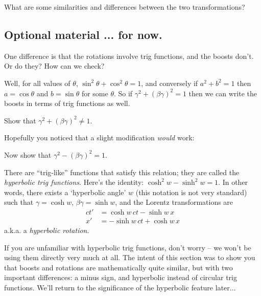 \documentclass[11pt, letterpaper, openany]{book}
\newenvironment{exercise}[1][Exercise]{%
  \tcolorbox[blanker, breakable, left=1em,
    before skip=1em, after skip=1em,
    borderline west={3pt}{0pt}{PhysNavy},
    colback=PhysCream,
    before upper={\textcolor{PhysNavy}{\sffamily\bfseries #1:}\space}
  ]%
}{%
  \endtcolorbox%
}
\begin{document}
\begin{exercise}[Discuss]
What are some similarities and differences between the two transformations?
\end{exercise}

\subsection{Optional material ... for now.}

One difference is that the rotations involve trig functions, and the boosts don't. Or do they? How can we check?

Well, for all values of $\theta$, $\sin^2\theta + \cos^2\theta = 1$, and conversely if $a^2 + b^2 = 1$ then $a = \cos\theta$ and $b = \sin\theta$ for some $\theta$. So if $\gamma^2 + (\beta\gamma)^2 = 1$ then we can write the boosts in terms of trig functions as well.

\begin{exercise}[Exercise 13]
Show that $\gamma^2 + (\beta\gamma)^2 \neq 1$.
\end{exercise}

Hopefully you noticed that a slight modification \textit{would} work:

\begin{exercise}[Exercise 14]
Now show that $\gamma^2 - (\beta\gamma)^2 = 1$.
\end{exercise}

There are ``trig-like'' functions that satisfy this relation; they are called the \textit{hyperbolic trig functions}. Here's the identity: $\cosh^2 w - \sinh^2 w = 1$. In other words, there exists a `hyperbolic angle' $w$ (this notation is not very standard) such that $\gamma = \cosh w$, $\beta\gamma = \sinh w$, and the Lorentz transformations are
\begin{align*}
    ct' &= \cosh w \, ct - \sinh w \, x \\
    x'  &= -\sinh w \, ct + \cosh w \, x 
\end{align*}
a.k.a. a \textit{hyperbolic rotation}.

If you are unfamiliar with hyperbolic trig functions, don't worry -- we won't be using them directly very much at all. The intent of this section was to show you that boosts and rotations are mathematically quite similar, but with two important differences: a minus sign, and hyperbolic instead of circular trig functions. We'll return to the significance of the hyperbolic feature later...

\end{document}

